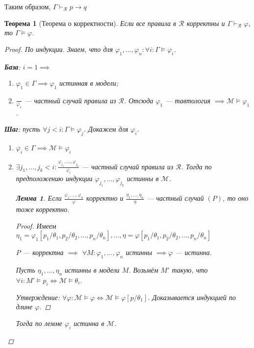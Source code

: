 \documentclass[12pt]{article}
\let\im\rightarrow
\let\ds\displaystyle
\theoremstyle{definition}
\theoremstyle{plain}
\newtheorem{theorem}{Теорема}[section]
\newtheorem{lemma}{Лемма}[section]
\theoremstyle{remark}
\begin{document}
Таким образом, $\Gamma \vdash_{\mathcal{R}} p \im q$

\begin{theorem}[Теорема о корректности]
  Если все правила в $\mathcal{R}$ корректны и $\Gamma
  \vdash_{\mathcal{R}} \varphi$, то $\Gamma \models \varphi$.
  \begin{proof}
    По индукции. Знаем, что для $\varphi_1, \dots, \varphi_n \colon
    \forall i \colon \Gamma \models \varphi_i$.

    \textbf{База}: $i = 1 \implies$
    \begin{enumerate}
      \item $\varphi_1 \in \Gamma \implies \varphi_1$ истинная в модели;

      \item $\ds\frac{}{\varphi_1}$ --- частный случай правила из
        $\mathcal{R}$. Отсюда $\varphi_1$ --- тавтология $\implies
        \mathcal{M} \models \varphi_1$.
    \end{enumerate}

    \textbf{Шаг}: пусть $\forall j < i \colon \Gamma \models
    \varphi_j$. Докажем для $\varphi_i$.

    \begin{enumerate}
      \item $\varphi_i \in \Gamma \implies \mathcal{M} \models \varphi_i$

      \item $\exists j_1, \dots, j_k < i \colon \ds\frac{\varphi_{j_1},
        \dots, \varphi_{j_k}}{\varphi_i}$ --- частный случай правила
        из $\mathcal{R}$. Тогда по предположению индукции
        $\varphi_{j_1}, \dots, \varphi_{j_k}$ истинны в $\mathcal{M}$.

        \begin{lemma}
          Если $\ds\frac{\varphi_1, \dots, \varphi_n}{\varphi}$
          корректно и $\ds\frac{\eta_1, \dots, \eta_n}{\eta}$ ---
          частный случай $(P)$, то оно тоже корректно.
          \begin{proof}
            Имеем $\eta_1 = \varphi_1[p_1/\theta_1, p_2/\theta_2, \dots,
            p_n /\theta_n], \dots, \eta = \varphi[p_1/\theta_1, p_2/\theta_2,
            \dots, p_n/\theta_n]$

            $P$ --- корректна $\implies$ $\forall M \colon \varphi_1,
            \dots, \varphi_n$ истинны $\implies \varphi$ --- истинна.

            Пусть $\eta_1, \dots, \eta_n$ истинны в модели $M$.
            Возьмём $M'$ такую, что $\forall i \colon M' \models p_i
            \iff \mathcal{M} \models \theta_i$.

            Утверждение: $\forall \varphi \colon \mathcal{M} \models
            \varphi \iff \mathcal{M} \models \varphi[p / \theta_1]$.
            Доказывается индукцией по длине $\varphi$.
          \end{proof}
        \end{lemma}
        Тогда по лемме $\varphi_i$ истинна в $\mathcal{M}$.
    \end{enumerate}
  \end{proof}
\end{theorem}
\end{document}
